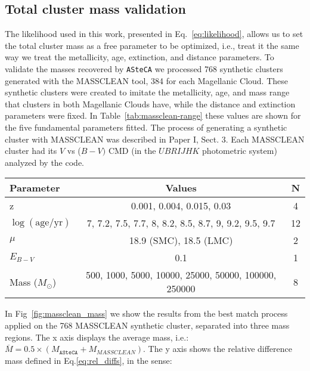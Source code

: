 \documentclass{aa}
\begin{document}
\begin{appendix}

\section{Total cluster mass validation}
\label{apdx:mass_valid}

The likelihood used in this work, presented in Eq.~\ref{eq:likelihood}, allows
us to set the total cluster mass as a free parameter to be optimized, i.e.,
treat it the same way we treat the metallicity, age, extinction, and distance
parameters.
To validate the masses recovered by \texttt{ASteCA} we processed 768 synthetic
clusters generated with the MASSCLEAN tool, 384 for each Magellanic Cloud.
%
These synthetic clusters were created to imitate the metallicity, age, and mass
range that clusters in both Magellanic Clouds have, while the distance and
extinction parameters were fixed. In Table~\ref{tab:massclean-range} these
values are shown for the five fundamental parameters fitted.
The process of generating a synthetic cluster with MASSCLEAN was described in
Paper I, Sect. 3. Each MASSCLEAN cluster had its $V$ vs ($B-V)$ CMD (in the
$UBRIJHK$ photometric system) analyzed by the code.

\begin{table*}
\centering
\caption{Parameters values used to generate the set of 768 MASSCLEAN
synthetic clusters.}
\label{tab:massclean-range}
\begin{tabular}{lcc}
\hline\hline
 Parameter & Values & N\\
\hline
z & 0.001, 0.004, 0.015, 0.03 & 4\\
$\log\mathrm{(age/yr)}$ & 7, 7.2, 7.5, 7.7, 8, 8.2, 8.5, 8.7, 9, 9.2, 9.5, 9.7 &
12\\
$\mu$ & 18.9 (SMC), 18.5 (LMC) & 2\\
$E_{B-V}$ & 0.1 & 1\\
Mass ($M_{\odot}$) & 500, 1000, 5000, 10000, 25000, 50000, 100000, 250000 & 8\\
\hline
\end{tabular}
\end{table*}

In Fig~\ref{fig:massclean_mass} we show the results from the best match process
applied on the 768 MASSCLEAN synthetic cluster, separated into three mass
regions. The x axis displays the average
mass, i.e.: $\overline{M}=0.5\times(M_{\mathtt{ASteCA}}+M_{MASSCLEAN})$.
The y axis shows the relative difference mass defined in Eq.\ref{eq:rel_diffs},
in the sense:


\end{appendix}
\end{document}
